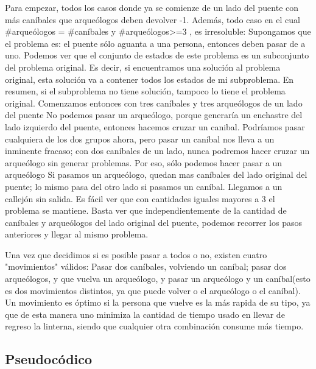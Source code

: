 \documentclass[spanish,12pt]{article}
\begin{document}
Para empezar, todos los casos donde ya se comienze de un lado del puente con más caníbales que arqueólogos deben devolver -1. Además, todo caso en el cual #arqueólogos = #caníbales y #arqueólogos>=3 , es irresoluble:
Supongamos que el problema es: el puente sólo aguanta a una persona, entonces deben pasar de a uno. Podemos ver que el conjunto de estados de este problema es un subconjunto del problema original. Es decir, si encuentramos una solución al problema original, esta solución va a contener todos los estados de mi subproblema. En resumen, si el subproblema no tiene solución, tampoco lo tiene el problema original.
Comenzamos entonces con tres caníbales y tres arqueólogos de un lado del puente
No podemos pasar un arqueólogo, porque generaría un enchastre del lado izquierdo del puente, entonces hacemos cruzar un canibal.
Podríamos pasar cualquiera de los dos grupos ahora, pero pasar un caníbal nos lleva a un inminente fracaso; con dos caníbales de un lado, nunca podremos hacer cruzar un arqueólogo sin generar problemas. Por eso, sólo podemos hacer pasar a un arqueólogo
Si pasamos un arqueólogo, quedan mas caníbales del lado original del puente; lo mismo pasa del otro lado si pasamos un caníbal. Llegamos a un callejón sin salida.
Es fácil ver que con cantidades iguales mayores a 3 el problema se mantiene. Basta ver que independientemente de la cantidad de caníbales y arqueólogos del lado original del puente, podemos recorrer los pasos anteriores y llegar al mismo problema.

Una vez que decidimos si es posible pasar a todos o no, existen cuatro "movimientos"  válidos: Pasar dos caníbales, volviendo un caníbal; pasar dos arqueólogos, y que vuelva un arqueólogo, y pasar un arqueólogo y un caníbal(esto es dos movimientos distintos, ya que puede volver o el arqueólogo o el caníbal). Un movimiento es óptimo si la persona que vuelve es la más rapida de su tipo, ya que de esta manera uno minimiza la cantidad de tiempo usado en llevar de regreso la linterna, siendo que cualquier otra combinación consume más tiempo.



\subsection{Pseudocódico}
\end{document}
